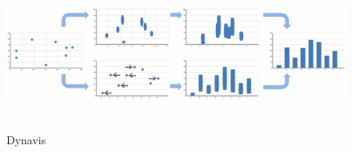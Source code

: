 \begin{figure}[!htb]
\centering
\includegraphics[height=5cm]{images/methods/related/dynavis.png}
\caption[
    Dynavis 
]{Dynavis}
\label{fig:dynavis}
\end{figure}







